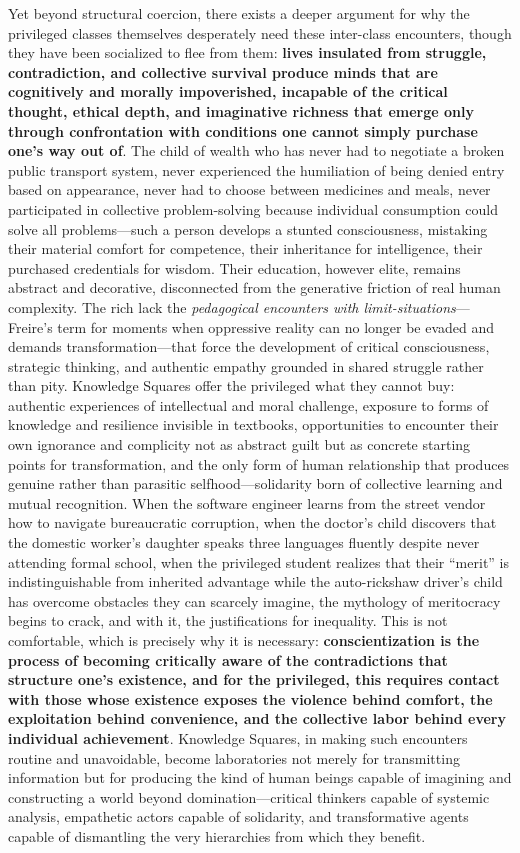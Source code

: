 Yet beyond structural coercion, there exists a deeper argument for why
the privileged classes themselves desperately need these inter-class
encounters, though they have been socialized to flee from them:
\textbf{lives insulated from struggle, contradiction, and collective
survival produce minds that are cognitively and morally impoverished,
incapable of the critical thought, ethical depth, and imaginative
richness that emerge only through confrontation with conditions one
cannot simply purchase one's way out of}. The child of wealth who has
never had to negotiate a broken public transport system, never
experienced the humiliation of being denied entry based on appearance,
never had to choose between medicines and meals, never participated in
collective problem-solving because individual consumption could solve
all problems---such a person develops a stunted consciousness, mistaking
their material comfort for competence, their inheritance for
intelligence, their purchased credentials for wisdom. Their education,
however elite, remains abstract and decorative, disconnected from the
generative friction of real human complexity. The rich lack the
\emph{pedagogical encounters with limit-situations}---Freire's term for
moments when oppressive reality can no longer be evaded and demands
transformation---that force the development of critical consciousness,
strategic thinking, and authentic empathy grounded in shared struggle
rather than pity. Knowledge Squares offer the privileged what they
cannot buy: authentic experiences of intellectual and moral challenge,
exposure to forms of knowledge and resilience invisible in textbooks,
opportunities to encounter their own ignorance and complicity not as
abstract guilt but as concrete starting points for transformation, and
the only form of human relationship that produces genuine rather than
parasitic selfhood---solidarity born of collective learning and mutual
recognition. When the software engineer learns from the street vendor
how to navigate bureaucratic corruption, when the doctor's child
discovers that the domestic worker's daughter speaks three languages
fluently despite never attending formal school, when the privileged
student realizes that their ``merit'' is indistinguishable from
inherited advantage while the auto-rickshaw driver's child has overcome
obstacles they can scarcely imagine, the mythology of meritocracy begins
to crack, and with it, the justifications for inequality. This is not
comfortable, which is precisely why it is necessary:
\textbf{conscientization is the process of becoming critically aware of
the contradictions that structure one's existence, and for the
privileged, this requires contact with those whose existence exposes the
violence behind comfort, the exploitation behind convenience, and the
collective labor behind every individual achievement}. Knowledge
Squares, in making such encounters routine and unavoidable, become
laboratories not merely for transmitting information but for producing
the kind of human beings capable of imagining and constructing a world
beyond domination---critical thinkers capable of systemic analysis,
empathetic actors capable of solidarity, and transformative agents
capable of dismantling the very hierarchies from which they benefit.

